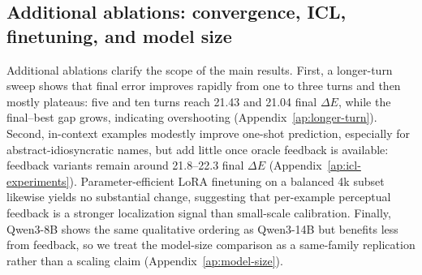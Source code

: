 \documentclass[11pt]{article}
\begin{document}



\subsection{Additional ablations: convergence, ICL, finetuning, and model size}
\label{sec:results_additional}

Additional ablations clarify the scope of the main results. First, a
longer-turn sweep shows that final error improves rapidly from one to three
turns and then mostly plateaus: five and ten turns reach 21.43 and 21.04
final $\Delta E$, while the final--best gap grows, indicating overshooting
(Appendix~\ref{ap:longer-turn}). Second, in-context examples modestly
improve one-shot prediction, especially for abstract-idiosyncratic names,
but add little once oracle feedback is available: feedback variants remain
around 21.8--22.3 final $\Delta E$ (Appendix~\ref{ap:icl-experiments}).
Parameter-efficient LoRA finetuning on a balanced 4k subset likewise yields
no substantial change, suggesting that per-example perceptual feedback is a
stronger localization signal than small-scale calibration. Finally, Qwen3-8B
shows the same qualitative ordering as Qwen3-14B but benefits less from
feedback, so we treat the model-size comparison as a same-family replication
rather than a scaling claim (Appendix~\ref{ap:model-size}).
\end{document}
